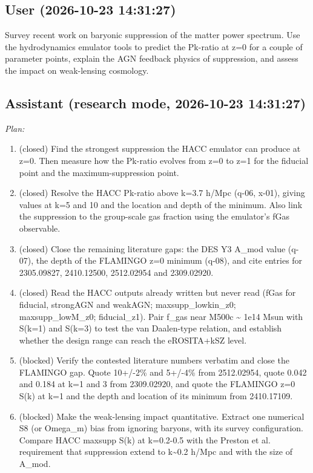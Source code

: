 \documentclass[11pt,a4paper]{article}
\begin{document}
\subsection*{User \small(2026-10-23 14:31:27)}
Survey recent work on baryonic suppression of the matter power spectrum. Use the hydrodynamics emulator tools to predict the Pk-ratio at z=0 for a couple of parameter points, explain the AGN feedback physics of suppression, and assess the impact on weak-lensing cosmology.

\subsection*{Assistant \small(research mode, 2026-10-23 14:31:27)}
\textit{Plan:}\begin{enumerate}
  \item (closed) Find the strongest suppression the HACC emulator can produce at z=0. Then measure how the Pk-ratio evolves from z=0 to z=1 for the fiducial point and the maximum-suppression point.
  \item (closed) Resolve the HACC Pk-ratio above k=3.7 h/Mpc (q-06, x-01), giving values at k=5 and 10 and the location and depth of the minimum. Also link the suppression to the group-scale gas fraction using the emulator's fGas observable.
  \item (closed) Close the remaining literature gaps: the DES Y3 A\_mod value (q-07), the depth of the FLAMINGO z=0 minimum (q-08), and cite entries for 2305.09827, 2410.12500, 2512.02954 and 2309.02920.
  \item (closed) Read the HACC outputs already written but never read (fGas for fiducial, strongAGN and weakAGN; maxsupp\_lowkin\_z0; maxsupp\_lowM\_z0; fiducial\_z1). Pair f\_gas near M500c \textasciitilde{} 1e14 Msun with S(k=1) and S(k=3) to test the van Daalen-type relation, and establish whether the design range can reach the eROSITA+kSZ level.
  \item (blocked) Verify the contested literature numbers verbatim and close the FLAMINGO gap. Quote 10+/-2\% and 5+/-4\% from 2512.02954, quote 0.042 and 0.184 at k=1 and 3 from 2309.02920, and quote the FLAMINGO z=0 S(k) at k=1 and the depth and location of its minimum from 2410.17109.
  \item (blocked) Make the weak-lensing impact quantitative. Extract one numerical S8 (or Omega\_m) bias from ignoring baryons, with its survey configuration. Compare HACC maxsupp S(k) at k=0.2-0.5 with the Preston et al. requirement that suppression extend to k\textasciitilde{}0.2 h/Mpc and with the size of A\_mod.
\end{enumerate}
\end{document}
